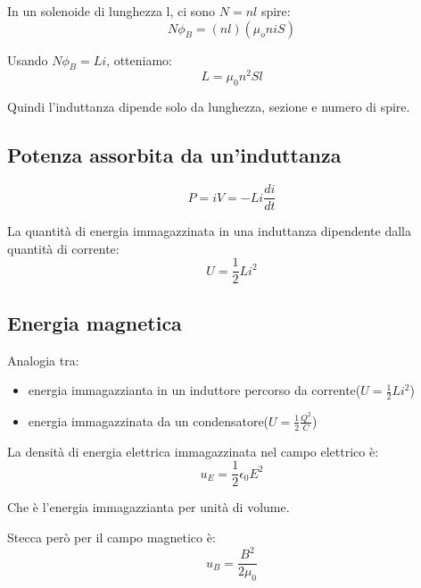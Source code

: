 In un solenoide di lunghezza l, ci sono $N=nl$ spire:
\begin{equation}
    N\phi_B = (nl)(\mu_oniS)
\end{equation}

Usando $N\phi_B = Li$, otteniamo:
\begin{equation}
    L = \mu_0n^2Sl
\end{equation}

Quindi l'induttanza dipende solo da lunghezza, sezione e 
numero di spire.


\subsection{Potenza assorbita da un'induttanza}

\begin{equation}
    P = iV = -Li\frac{di}{dt}
\end{equation}

La quantità di energia immagazzinata in una induttanza dipendente
dalla quantità di corrente:
\begin{equation}
    U = \frac{1}{2}Li^2
\end{equation}


\subsection{Energia magnetica}

Analogia tra:
\begin{itemize}
    \item energia immagazzianta in un induttore percorso da corrente($U = \frac{1}{2}Li^2$)
    \item energia immagazzinata da un condensatore($U = \frac{1}{2}\frac{Q^2}{C}$)
\end{itemize}


La densità di energia elettrica immagazzinata nel campo elettrico è:
\begin{equation}
    u_E = \frac{1}{2}\epsilon_0E^2
\end{equation}

Che è l'energia immagazzianta per unità di volume.


Stecca però per il campo magnetico è:
\begin{equation}
    u_B = \frac{B^2}{2\mu_0}
\end{equation}

